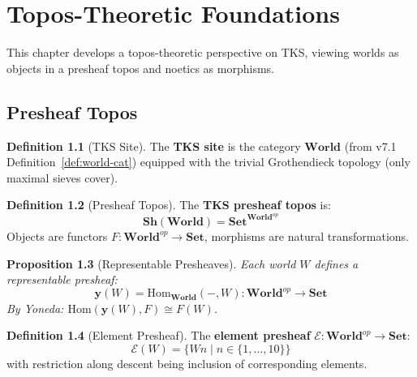 \documentclass[11pt,twoside,openright]{book}
\theoremstyle{definition}
\newtheorem{definition}{Definition}[chapter]
\theoremstyle{plain}
\newtheorem{proposition}[definition]{Proposition}
\theoremstyle{remark}
\newcommand{\Sh}{\mathbf{Sh}}                %
\newcommand{\vnewtwo}{\textbf{v7.2 New}}
\begin{document}

\chapter{Topos-Theoretic Foundations}
\label{ch:topos}

\begin{tcolorbox}[colback=blue!5!white,colframe=blue!75!black,title=\vnewtwo]
This chapter develops a topos-theoretic perspective on TKS, viewing worlds as objects in a presheaf topos and noetics as morphisms.
\end{tcolorbox}

\section{Presheaf Topos}

\begin{definition}[TKS Site]
\label{def:tks-site}
The \textbf{TKS site} is the category $\mathbf{World}$ (from v7.1 Definition~\ref{def:world-cat}) equipped with the trivial Grothendieck topology (only maximal sieves cover).
\end{definition}

\begin{definition}[Presheaf Topos]
\label{def:presheaf-topos}
The \textbf{TKS presheaf topos} is:
\[
\Sh(\mathbf{World}) = \mathbf{Set}^{\mathbf{World}^{op}}
\]
Objects are functors $F : \mathbf{World}^{op} \to \mathbf{Set}$, morphisms are natural transformations.
\end{definition}

\begin{proposition}[Representable Presheaves]
\label{prop:representable}
Each world $W$ defines a representable presheaf:
\[
\mathbf{y}(W) = \mathrm{Hom}_{\mathbf{World}}(-, W) : \mathbf{World}^{op} \to \mathbf{Set}
\]
By Yoneda: $\mathrm{Hom}(\mathbf{y}(W), F) \cong F(W)$.
\end{proposition}

\begin{definition}[Element Presheaf]
\label{def:element-presheaf}
The \textbf{element presheaf} $\mathcal{E} : \mathbf{World}^{op} \to \mathbf{Set}$:
\[
\mathcal{E}(W) = \{Wn \mid n \in \{1, \ldots, 10\}\}
\]
with restriction along descent being inclusion of corresponding elements.
\end{definition}
\end{document}
